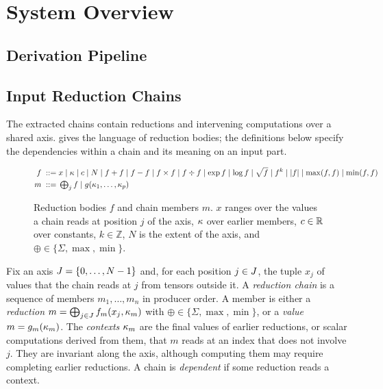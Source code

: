 \section{System Overview}
\label{sec:chains}

\subsection{Derivation Pipeline}



\subsection{Input Reduction Chains}
\label{sec:input-chains}

The extracted chains contain reductions and intervening computations over a shared axis.
 gives the language of reduction bodies; the definitions below specify the dependencies within a chain and its meaning on an input part.

\begin{figure}[htbp]
\small
\begin{align*}
f \;::=\;& x \mid \kappa \mid c \mid N
 \mid f + f \mid f - f \mid f \times f \mid f \div f
 \mid \exp f \mid \log f \mid \sqrt{f} \mid f^{k} \mid |f| \mid \max(f,f) \mid \min(f,f)\\
m \;::=\;& \textstyle\bigoplus_{j} f \mid g(\kappa_1,\dots,\kappa_p)
\end{align*}
\caption{Reduction bodies $f$ and chain members $m$. $x$ ranges over the values a chain reads at position $j$ of the axis, $\kappa$ over earlier members, $c\in\mathbb{R}$ over constants, $k\in\mathbb{Z}$, $N$ is the extent of the axis, and $\oplus\in\{\Sigma,\max,\min\}$.}
\label{fig:grammar}
\end{figure}

\begin{definition}
\label{def:chain}
Fix an axis $J=\{0,\dots,N-1\}$ and, for each position $j\in J$, the tuple $x_j$ of values that the chain reads at $j$ from tensors outside it.
A \emph{reduction chain} is a sequence of members $m_1,\dots,m_n$ in producer order.
A member is either a \emph{reduction} $m=\bigoplus_{j\in J} f_m(x_j,\kappa_m)$ with $\oplus\in\{\Sigma,\max,\min\}$, or a \emph{value} $m=g_m(\kappa_m)$.
The \emph{contexts} $\kappa_m$ are the final values of earlier reductions, or scalar computations derived from them, that $m$ reads at an index that does not involve $j$.
They are invariant along the axis, although computing them may require completing earlier reductions.
A chain is \emph{dependent} if some reduction reads a context.
\end{definition}

